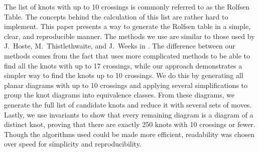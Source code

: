 
\code
\diagrams
\theorems

\begin{paperabs}
The list of knots with up to 10 crossings is commonly referred to as the Rolfsen
Table.
The concepts behind the calculation of this list are rather hard to implement.
This paper presents a way to generate the Rolfsen table in a simple, clear, and
reproducible manner.
The methods we use are similar to those used by J.~Hoste, M.~Thistlethwaite, and
J.~Weeks in \cite{htw}.
The difference between our methods comes from the fact that \cite{htw} uses more
complicated methods to be able to find all the knots with up to 17 crossings,
while our approach demonstrates a simpler way to find the knots up to 10
crossings.
We do this by generating all planar diagrams with up to 10 crossings and
applying several simplifications to group the knot diagrams into equivalence
classes.
From these diagrams, we generate the full list of candidate knots and reduce it
with several sets of moves.
Lastly, we use invariants to show that every remaining diagram is a diagram of a
distinct knot, proving that there are exactly 250 knots with 10 crossings or
fewer.
Though the algorithms used could be made more efficient, readability was chosen
over speed for simplicity and reproducibility.
\end{paperabs}
